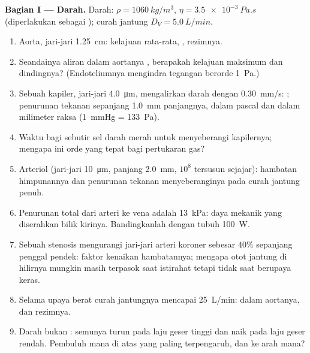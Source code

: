 \begin{problem}
\medskip
\noindent\textbf{Bagian I --- Darah.}
Darah: $\rho = \qty{1060}{kg/m^3}$, $\eta = \qty{3.5e-3}{Pa.s}$ (diperlakukan
sebagai ); curah jantung $D_V = \qty{5.0}{L/min}$.
\begin{enumerate}
  \item Aorta, jari-jari \qty{1.25}{cm}: kelajuan rata-rata, , rezimnya.
  \item Seandainya aliran dalam aortanya , berapakah
        kelajuan maksimum dan  dindingnya? (Endoteliumnya
        mengindra tegangan berorde \qty{1}{Pa}.)
  \item Sebuah kapiler, jari-jari \qty{4.0}{\micro m}, mengalirkan darah dengan
        \qty{0.30}{mm/s}: ; penurunan tekanan sepanjang
        \qty{1.0}{mm} panjangnya, dalam pascal dan dalam milimeter raksa
        (\qty{1}{mmHg} = \qty{133}{Pa}).
  \item Waktu bagi sebutir sel darah merah untuk menyeberangi kapilernya; mengapa ini
        orde yang tepat bagi pertukaran gas?
  \item Arteriol (jari-jari \qty{10}{\micro m}, panjang \qty{2.0}{mm}, $10^8$
        tersusun sejajar): hambatan himpunannya dan penurunan tekanan
        menyeberanginya pada curah jantung penuh.
  \item Penurunan total dari arteri ke vena adalah \qty{13}{kPa}: daya
        mekanik yang diserahkan bilik kirinya. Bandingkanlah dengan
        tubuh \qty{100}{W}.
  \item Sebuah stenosis mengurangi jari-jari arteri koroner sebesar $40\%$
        sepanjang penggal pendek: faktor kenaikan hambatannya; mengapa
        otot jantung di hilirnya mungkin masih terpasok saat istirahat
        tetapi tidak saat berupaya keras.
  \item Selama upaya berat curah jantungnya mencapai \qty{25}{L/min}:
         dalam aortanya, dan rezimnya.
  \item Darah bukan :  semunya turun pada laju
        geser tinggi dan naik pada laju geser rendah. Pembuluh mana di
        atas yang paling terpengaruh, dan ke arah mana?
\end{enumerate}


\end{problem}
